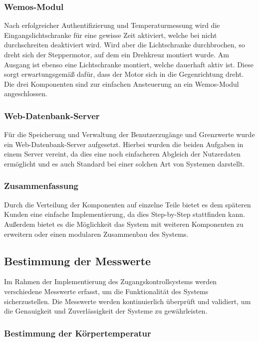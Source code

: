 \subsubsection{Wemos-Modul}

Nach erfolgreicher Authentifizierung und Temperaturmessung wird die Eingangslichtschranke für eine gewisse Zeit aktiviert, welche bei nicht durchschreiten deaktiviert wird. Wird aber die Lichtschranke durchbrochen, so dreht sich der Steppermotor, auf dem ein Drehkreuz montiert wurde. Am Ausgang ist ebenso eine Lichtschranke montiert, welche dauerhaft aktiv ist. Diese sorgt erwartungsgemäß dafür, dass der Motor sich in die Gegenrichtung dreht. Die drei Komponenten sind zur einfachen Ansteuerung an ein Wemos-Modul angeschlossen.

\subsubsection{Web-Datenbank-Server}

Für die Speicherung und Verwaltung der Benutzerzugänge und Grenzwerte wurde ein Web-Datenbank-Server aufgesetzt. Hierbei wurden die beiden Aufgaben in einem Server vereint, da dies eine noch einfacheren Abgleich der Nutzerdaten ermöglicht und es auch Standard bei einer solchen Art von Systemen darstellt.

\subsubsection{Zusammenfassung}

Durch die Verteilung der Komponenten auf einzelne Teile bietet es dem späteren Kunden eine einfache Implementierung, da dies Step-by-Step stattfinden kann. Außerdem bietet es die Möglichkeit das System mit weiteren Komponenten zu erweitern oder einen modularen Zusammenbau des Systems.


\subsection{Bestimmung der Messwerte}

Im Rahmen der Implementierung des Zugangskontrollsystems werden verschiedene Messwerte erfasst, um die Funktionalität des Systems sicherzustellen. Die Messwerte werden kontinuierlich überprüft und validiert, um die Genauigkeit und Zuverlässigkeit der Systeme zu gewährleisten.

\subsubsection{Bestimmung der Körpertemperatur}

